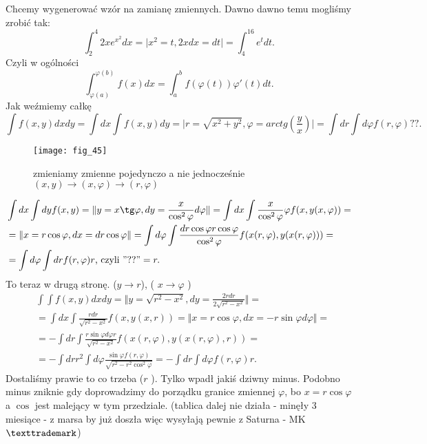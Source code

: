 \documentclass[../main.tex]{subfiles}
\begin{document}
    Chcemy wygenerować wzór na zamianę zmiennych.
    Dawno dawno temu mogliśmy zrobić tak:
    \[
    \int_2^4 2xe^{x^2}dx =  \mid x^2 = t, 2xdx = dt  \mid=  \int_4^{16}e^{t}dt
    .\]
    Czyli w ogólności
    \[
        \int_{\varphi(a)}^{\varphi(b)}f(x)dx = \int_a^b f(\varphi(t))\varphi'(t)dt
    .\]
    Jak weźmiemy całkę
    \[
        \int f(x,y) dxdy = \int dx \int f(x,y)dy = \mid r=\sqrt{x^2+y^2} , \varphi = arctg(\frac{y}{x})   \mid =  \int dr \int d  \varphi f(r,\varphi) ??
    .\]
    \begin{figure}[h]
        \centering
        \texttt{[image: fig\_45]}
        \caption{zmieniamy zmienne pojedynczo a nie jednocześnie $(x,y)\to (x,\varphi)\to (r,\varphi)$}
    \end{figure}
    \begin{align*}
    &\int dx \int dy f(x,y) = \Vert y = x \tg \varphi, dy = \frac{x}{\cos^2 \varphi}d \varphi \Vert = \int dx \int \frac{x}{\cos^2 \varphi} \varphi f(x,y(x,\varphi))= \\
    &=\Vert x=r \cos \varphi, dx =dr \cos \varphi \Vert = \int d \varphi \int \frac{dr \cos\varphi r \cos \varphi}{\cos^2 \varphi} f(x(r,\varphi), y(x(r,\varphi))) =\\
    &= \int d \varphi \int dr f(r,\varphi) r \text{, czyli } "??" = r
    .\end{align*}
    To teraz w drugą stronę. ($y\to r$), ( $x\to \varphi$ )
    \begin{align*}
        &\int \int f(x,y) dxdy = \Vert y = \sqrt{r^2 - x^2} , dy = \frac{2r dr}{2 \sqrt{r^2-x^2} } \Vert = \\
        &= \int dx \int \frac{r dr}{\sqrt{r^2 - x^2} } f(x,y(x,r)) = \Vert x=r \cos \varphi, dx = -r \sin\varphi d\varphi \Vert = \\
        &=-\int dr \int \frac{r \sin\varphi d \varphi r}{\sqrt{r^2 - x^2} } f(x(r,\varphi),y(x(r,\varphi),r)) = \\
        &= -\int dr r^2 \int d\varphi \frac{\sin\varphi f(r,\varphi)}{\sqrt{r^2 - r^2 \cos^2 \varphi} } = -\int dr \int d\varphi f(r,\varphi) r
    .\end{align*}
    Dostaliśmy prawie to co trzeba ($r$ ). Tylko wpadł jakiś dziwny minus. Podobno minus zniknie gdy doprowadzimy do porządku granice zmiennej $\varphi$, bo $x = r \cos \varphi$ a $\cos$ jest malejący w tym przedziale. (tablica dalej nie działa - minęły 3 miesiące - z marsa by już doszła więc wysyłają pewnie z Saturna - MK$\texttrademark$)
\end{document}
